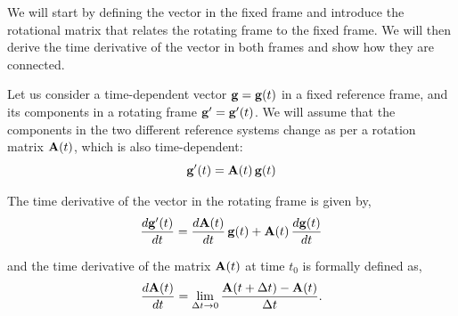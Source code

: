 \documentclass[12pt]{article}
\begin{document}
We will start by defining the vector in the fixed frame and introduce the rotational matrix
that relates the rotating frame to the fixed frame. We will then derive the time derivative
of the vector in both frames and show how they are connected.

Let us consider a time-dependent vector $\vb{g} = \vb{g}(t)$ in a fixed reference frame,
and its components in a rotating frame $\vb{g}' = \vb{g}'(t)$. We will assume that the
components in the two different reference systems change as per a rotation matrix $\vb{A}(t)$,
which is also time-dependent:
\begin{equation}
  \vb{g}'(t) = \vb{A}(t)\,\vb{g}(t)
\end{equation}

The time derivative of the vector in the rotating frame is given by,
\begin{equation}
  \frac{d\vb{g}'(t)}{dt} = \frac{d\vb{A}(t)}{dt}\,\vb{g}(t) + \vb{A}(t)\,\frac{d\vb{g}(t)}{dt}
\end{equation}

and the time derivative of the matrix $\vb{A}(t)$ at time $t_0$ is formally defined as,
\begin{equation}
  \frac{d\vb{A}(t)}{dt} = \lim_{\Delta t \to 0}\frac{\vb{A}(t+\Delta t) - \vb{A}(t)}{\Delta t}.
\end{equation}
\end{document}
